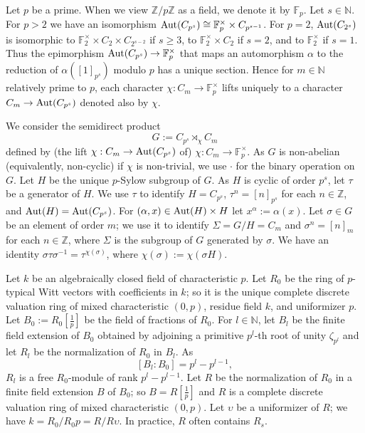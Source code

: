 \documentclass[11pt]{amsart}
\def\Aut{\textup{Aut}}
\begin{document}
Let $p$ be a prime. When we view $\mathbb Z/p\mathbb Z$ as a field, we denote it by $\mathbb F_p$. Let $s\in\mathbb N$. For $p>2$ we have an isomorphism $\Aut(C_{p^s})\cong\mathbb F_p^{\times}\times C_{p^{s-1}}$. For $p=2$, $\Aut(C_{2^s})$ is isomorphic to $\mathbb F_2^{\times}\times C_2\times C_{2^{s-2}}$ if $s\ge 3$, to $\mathbb F_2^{\times}\times C_2$ if $s=2$, and to $\mathbb F_2^{\times}$ if $s=1$. Thus the epimorphism $\Aut(C_{p^s})\rightarrow\mathbb F_p^{\times}$ that maps an automorphism $\alpha$ to the reduction of $\alpha([1]_{p^s})$ modulo $p$ has a unique section. Hence for $m\in\mathbb N$ relatively prime to $p$, each character $\chi:C_m\rightarrow\mathbb F_p^{\times}$ lifts uniquely to a character $C_m\rightarrow\Aut(C_{p^s})$ denoted also by $\chi$.

We consider the semidirect product 
$$G:=C_{p^s}\rtimes_{\chi} C_m$$ 
defined by (the lift $\chi:C_m\rightarrow\Aut(C_{p^s})$ of) $\chi:C_m\rightarrow\mathbb F_p^{\times}$. As $G$ is non-abelian (equivalently, non-cyclic) if $\chi$ is non-trivial, we use $\cdot$ for the binary operation on $G$. Let $H$ be the unique $p$-Sylow subgroup of $G$. As $H$ is cyclic of order $p^s$, let $\tau$ be a generator of $H$. We use $\tau$ to identify $H=C_{p^s}$, $\tau^n=[n]_{p^s}$ for each $n\in\mathbb Z$, and $\Aut(H)=\Aut(C_{p^s})$. For $(\alpha,x)\in\Aut(H)\times H$ let $x^{\alpha}:=\alpha(x)$. Let $\sigma\in G$ be an element of order $m$; we use it to identify $\Sigma=G/H=C_m$ and $\sigma^n=[n]_m$ for each $n\in\mathbb Z$, where $\Sigma$ is the subgroup of $G$ generated by $\sigma$. We have an identity $\sigma\tau\sigma^{-1}=\tau^{\chi(\sigma)}$, where $\chi(\sigma):=\chi(\sigma H)$.

Let $k$ be an algebraically closed field of characteristic $p$. Let $R_0$ be the ring of $p$-typical Witt vectors with coefficients in $k$; so it is the unique complete discrete valuation ring of mixed characteristic $(0,p)$, residue field $k$, and uniformizer $p$. Let $B_0:=R_0[\frac{1}{p}]$ be the field of fractions of $R_0$. For $l\in\mathbb N$, let $B_l$ be the finite field extension of $B_0$ obtained by adjoining a primitive $p^l$-th root of unity $\zeta_{p^l}$ and let $R_l$ be the normalization of $R_0$ in $B_l$. As
$$[B_l:B_0]=p^l-p^{l-1},$$ 
$R_l$ is a free $R_0$-module of rank $p^l-p^{l-1}$. Let $R$ be the normalization of $R_0$ in a finite field extension $B$ of $B_0$; so $B=R[\frac{1}{p}]$ and $R$ is a complete discrete valuation ring of mixed characteristic $(0,p)$. Let $\upsilon$ be a uniformizer of $R$; we have $k=R_0/R_0p=R/R\upsilon$. In practice, $R$ often contains $R_s$.
\end{document}
